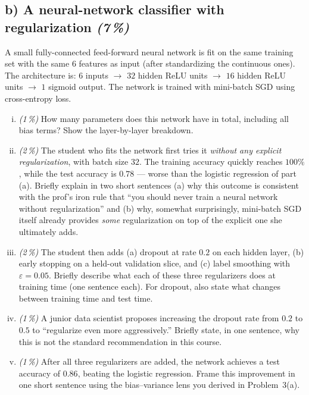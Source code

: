 \documentclass[11pt,a4paper]{article}
\newcommand{\subpoints}[1]{\textit{(#1\,\%)}}
\begin{document}
\subsection*{b) A neural-network classifier with regularization \subpoints{7}}

A small fully-connected feed-forward neural network is fit on the same training set with the same $6$ features as input (after standardizing the continuous ones). The architecture is: $6$ inputs $\to$ $32$ hidden ReLU units $\to$ $16$ hidden ReLU units $\to$ $1$ sigmoid output. The network is trained with mini-batch SGD using cross-entropy loss.

\begin{enumerate}[(i)]
  \item \subpoints{1} How many parameters does this network have in total, including all bias terms? Show the layer-by-layer breakdown.
  \item \subpoints{2} The student who fits the network first tries it \emph{without any explicit regularization}, with batch size $32$. The training accuracy quickly reaches $100\%$, while the test accuracy is $0.78$ --- worse than the logistic regression of part (a). Briefly explain in two short sentences (a) why this outcome is consistent with the prof's iron rule that ``you should never train a neural network without regularization'' and (b) why, somewhat surprisingly, mini-batch SGD itself already provides \emph{some} regularization on top of the explicit one she ultimately adds.
  \item \subpoints{2} The student then adds (a) dropout at rate $0.2$ on each hidden layer, (b) early stopping on a held-out validation slice, and (c) label smoothing with $\varepsilon = 0.05$. Briefly describe what each of these three regularizers does at training time (one sentence each). For dropout, also state what changes between training time and test time.
  \item \subpoints{1} A junior data scientist proposes increasing the dropout rate from $0.2$ to $0.5$ to ``regularize even more aggressively.'' Briefly state, in one sentence, why this is not the standard recommendation in this course.
  \item \subpoints{1} After all three regularizers are added, the network achieves a test accuracy of $0.86$, beating the logistic regression. Frame this improvement in one short sentence using the bias--variance lens you derived in Problem~3(a).
\end{enumerate}
\end{document}
